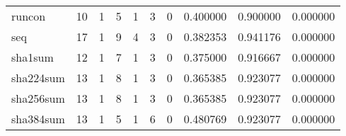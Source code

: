 \begin{longtable}{lrrrrrrrrr}
runcon    &                                       10 &                                                  1 &                                                  5 &                                                  1 &                                                  3 &                                                  0 &                                           0.400000 &                               0.900000 &                             0.000000 \\
seq       &                                       17 &                                                  1 &                                                  9 &                                                  4 &                                                  3 &                                                  0 &                                           0.382353 &                               0.941176 &                             0.000000 \\
sha1sum   &                                       12 &                                                  1 &                                                  7 &                                                  1 &                                                  3 &                                                  0 &                                           0.375000 &                               0.916667 &                             0.000000 \\
sha224sum &                                       13 &                                                  1 &                                                  8 &                                                  1 &                                                  3 &                                                  0 &                                           0.365385 &                               0.923077 &                             0.000000 \\
sha256sum &                                       13 &                                                  1 &                                                  8 &                                                  1 &                                                  3 &                                                  0 &                                           0.365385 &                               0.923077 &                             0.000000 \\
sha384sum &                                       13 &                                                  1 &                                                  5 &                                                  1 &                                                  6 &                                                  0 &                                           0.480769 &                               0.923077 &                             0.000000 \\

\end{longtable}
